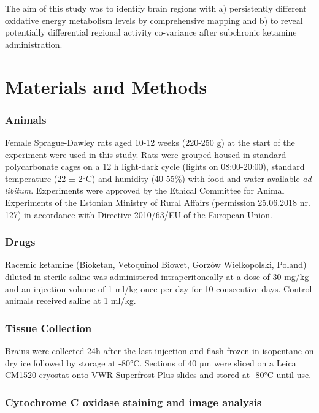 \documentclass[man]{apa6}
\begin{document}
The aim of this study was to identify brain regions with a) persistently different oxidative energy metabolism levels by comprehensive mapping and b) to reveal potentially differential regional activity co-variance after subchronic ketamine administration.

\hypertarget{materials-and-methods}{%
\section{Materials and Methods}\label{materials-and-methods}}

\hypertarget{animals}{%
\subsubsection{Animals}\label{animals}}

Female Sprague-Dawley rats aged 10-12 weeks (220-250 g) at the start of the experiment were used in this study. Rats were grouped-housed in standard polycarbonate cages on a 12 h light-dark cycle (lights on 08:00-20:00), standard temperature (22 ± 2°C) and humidity (40-55\%) with food and water available \emph{ad libitum}. Experiments were approved by the Ethical Committee for Animal Experiments of the Estonian Ministry of Rural Affairs (permission 25.06.2018 nr. 127) in accordance with Directive 2010/63/EU of the European Union.

\hypertarget{drugs}{%
\subsubsection{Drugs}\label{drugs}}

Racemic ketamine (Bioketan, Vetoquinol Biowet, Gorzów Wielkopolski, Poland) diluted in sterile saline was administered intraperitoneally at a dose of 30 mg/kg and an injection volume of 1 ml/kg once per day for 10 consecutive days. Control animals received saline at 1 ml/kg.

\hypertarget{tissue-collection}{%
\subsubsection{Tissue Collection}\label{tissue-collection}}

Brains were collected 24h after the last injection and flash frozen in isopentane on dry ice followed by storage at -80°C. Sections of 40 µm were sliced on a Leica CM1520 cryostat onto VWR Superfrost Plus slides and stored at -80°C until use.

\hypertarget{cytochrome-c-oxidase-staining-and-image-analysis}{%
\subsubsection{Cytochrome C oxidase staining and image analysis}\label{cytochrome-c-oxidase-staining-and-image-analysis}}
\end{document}
